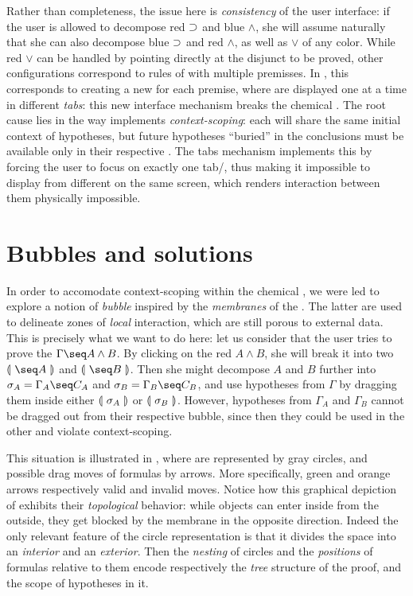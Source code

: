 \begin{scope}
Rather than completeness, the issue here is \emph{consistency} of the user
interface: if the user is allowed to decompose red $\supset$ and blue $\land$, she
will assume naturally that she can also decompose blue $\supset$ and red $\land$,
as well as $\lor$ of any color. While red $\lor$ can be handled by pointing
directly at the disjunct to be proved, other configurations correspond to rules
of  with multiple premisses. In , this corresponds to
creating a new  for each premise, where  are displayed one at a
time in different \emph{tabs}: this new interface mechanism breaks the chemical
. The root cause lies in the way  implements
\emph{context-scoping}: each  will share the same initial context of
hypotheses, but future hypotheses ``buried'' in the conclusions must be
available only in their respective . The tabs mechanism implements this
by forcing the user to focus on exactly one tab/, thus making it
impossible to display  from different  on the same screen, which
renders interaction between them physically impossible.


\section{Bubbles and solutions}

In order to accomodate context-scoping within the chemical , we were led
to explore a notion of \emph{bubble} inspired by the \emph{membranes} of the
{\cham} . The latter are used to delineate zones
of \emph{local} interaction, which are still porous to external data. This is
precisely what we want to do here: let us consider that the user tries to prove
the  $\Gamma \seq A \land B$. By clicking on the red  $A \land B$,
she will break it into two  $\bubbleT{\seq A}$ and $\bubbleT{\seq B}$.
Then she might decompose $A$ and $B$ further into  $\sigma_A = \Gamma_A
\seq C_A$ and $\sigma_B = \Gamma_B \seq C_B$, and use hypotheses from $\Gamma$
by dragging them inside either $\llparenthesis~\sigma_A~\rrparenthesis$ or $\llparenthesis~\sigma_B~\rrparenthesis$.
However, hypotheses from $\Gamma_A$ and $\Gamma_B$ cannot be dragged out from
their respective bubble, since then they could be used in the other  and
violate context-scoping.

This situation is illustrated in , where  are
represented by gray circles, and possible drag moves of formulas by arrows. More
specifically, green and orange arrows  respectively valid and invalid
moves. Notice how this graphical depiction of  exhibits their
\emph{topological} behavior: while objects can enter inside  from the
outside, they get blocked by the membrane in the opposite direction. Indeed the
only relevant feature of the circle representation is that it divides the space
into an \emph{interior} and an \emph{exterior}. Then the \emph{nesting} of
circles and the \emph{positions} of formulas relative to them encode
respectively the \emph{tree} structure of the proof, and the scope of hypotheses
in it.


\end{scope}
